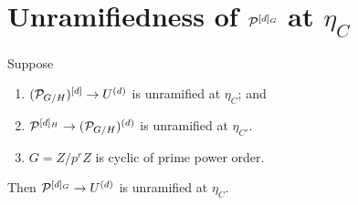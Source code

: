 \documentclass[11pt]{article}
\begin{document}
\section{Unramifiedness of \texorpdfstring{$\mathcal{P}^{[d]_G}$}{P\^{}[d]\_G} at \texorpdfstring{$\eta_C$}{eta\_C}}\label{sec:main}

\begin{theorem}\label{thm:main}
Suppose
\begin{enumerate}
  \item[\textnormal{(H1)}] $(\mathcal{P}_{G/H})^{[d]} \to U^{(d)}$ is unramified at
        $\eta_C$; and
  \item[\textnormal{(H2)}] $\mathcal{P}^{[d]_H} \to (\mathcal{P}_{G/H})^{(d)}$ is unramified at
        $\eta_{C'}$.
  \item $G=Z/p^rZ$ is cyclic of prime power order.
\end{enumerate}
Then $\mathcal{P}^{[d]_G} \to U^{(d)}$ is unramified at $\eta_C$.
\end{theorem}
\end{document}
